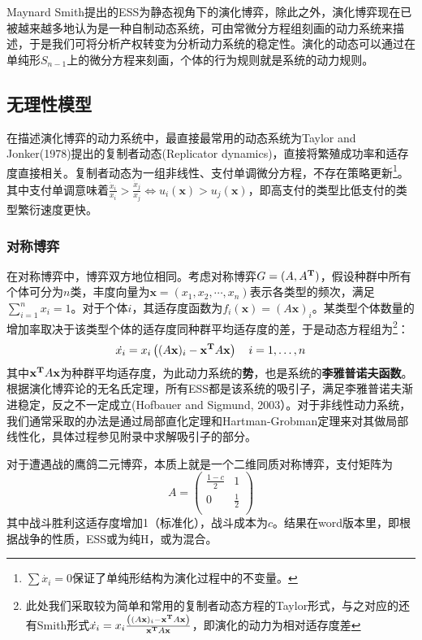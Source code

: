 \documentclass[lang=cn,12pt,a4paper]{elegantpaper}
\begin{document}
Maynard Smith提出的ESS为静态视角下的演化博弈，除此之外，演化博弈现在已被越来越多地认为是一种自制动态系统，可由常微分方程组刻画的动力系统来描述，于是我们可将分析产权转变为分析动力系统的稳定性。演化的动态可以通过在单纯形$S_{n-1}$上的微分方程来刻画，个体的行为规则就是系统的动力规则。


\subsection{无理性模型}

在描述演化博弈的动力系统中，最直接最常用的动态系统为Taylor and Jonker(1978)提出的复制者动态(Replicator dynamics)，直接将繁殖成功率和适存度直接相关。复制者动态为一组非线性、支付单调微分方程，不存在策略更新\footnote{$\sum {\dot {x_i}=0}$保证了单纯形结构为演化过程中的不变量。}。其中支付单调意味着$\frac{\dot{x}_{i}}{x_{i}}>\frac{\dot{x}_{j}}{x_{j}} \iff u_{i}(\mathbf{x})>u_{j}(\mathbf{x})$，即高支付的类型比低支付的类型繁衍速度更快。

\subsubsection{对称博弈}

在对称博弈中，博弈双方地位相同。考虑对称博弈$G=(A,A^{\bf{T}})$，假设种群中所有个体可分为$n$类，丰度向量为$\mathbf{x}=(x_1,x_2,\cdots,x_n)$表示各类型的频次，满足$ \sum_{i=1}^nx_i=1$。对于个体$i$，其适存度函数为$f_{i}(\mathbf{x})=(A \mathbf{x})_{i}$。某类型个体数量的增加率取决于该类型个体的适存度同种群平均适存度的差，于是动态方程组为\footnote{此处我们采取较为简单和常用的复制者动态方程的Taylor形式，与之对应的还有Smith形式$\dot{{x}_{i}}=x_{i}\frac{\left((A \mathbf{x})_{i}-\mathbf{x}^{\bf{T}}  A \mathbf{x}\right)}{\mathbf{x}^{\bf{T}}  A \mathbf{x}}$，即演化的动力为相对适存度差}：
\begin{equation}
\dot{{x}_{i}}=x_{i}\left((A \mathbf{x})_{i}-\mathbf{x}^{\bf{T}}  A \mathbf{x}\right) \quad i=1, \ldots, n
\end{equation}
其中$\mathbf{x}^{\bf{T}}  A \mathbf{x}$为种群平均适存度，为此动力系统的\textbf{势}，也是系统的\textbf{李雅普诺夫函数}。根据演化博弈论的无名氏定理，所有ESS都是该系统的吸引子，满足李雅普诺夫渐进稳定，反之不一定成立(Hofbauer and Sigmund, 2003）。对于非线性动力系统，我们通常采取的办法是通过局部直化定理和Hartman-Grobman定理来对其做局部线性化，具体过程参见附录中求解吸引子的部分。

对于遭遇战的鹰鸽二元博弈，本质上就是一个二维同质对称博弈，支付矩阵为
\begin{equation}
A=\begin{pmatrix}
\frac{1-c}{2} & 1\\
0 & \frac{1}{2}\\
\end{pmatrix}
\end{equation}
其中战斗胜利这适存度增加1（标准化），战斗成本为$c$。结果在word版本里，即根据战争的性质，ESS或为纯H，或为混合。
\end{document}
